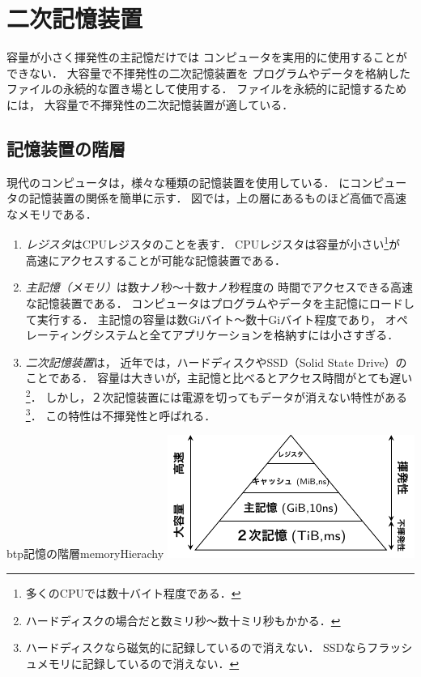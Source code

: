 \chapter{二次記憶装置}
容量が小さく揮発性の主記憶だけでは
コンピュータを実用的に使用することができない．
大容量で不揮発性の二次記憶装置を
プログラムやデータを格納したファイルの永続的な置き場として使用する．
ファイルを永続的に記憶するためには，
大容量で不揮発性の二次記憶装置が適している．

\section{記憶装置の階層}
現代のコンピュータは，様々な種類の記憶装置を使用している．
にコンピュータの記憶装置の関係を簡単に示す．
図では，上の層にあるものほど高価で高速なメモリである．

\begin{enumerate}
\item \emph{レジスタ}はCPUレジスタのことを表す．
  CPUレジスタは容量が小さい\footnote{多くのCPUでは数十バイト程度である．}が
  高速にアクセスすることが可能な記憶装置である．

\item \emph{主記憶（メモリ）}は数ナノ秒〜十数ナノ秒程度の
  時間でアクセスできる高速な記憶装置である．
  コンピュータはプログラムやデータを主記憶にロードして実行する．
  主記憶の容量は数Giバイト〜数十Giバイト程度であり，
  オペレーティングシステムと全てアプリケーションを格納すには小さすぎる．

\item \emph{二次記憶装置}は，
  近年では，ハードディスクやSSD（Solid State Drive）のことである．
  容量は大きいが，主記憶と比べるとアクセス時間がとても遅い\footnote{
    ハードディスクの場合だと数ミリ秒〜数十ミリ秒もかかる．}．
  しかし，２次記憶装置には電源を切ってもデータが消えない特性がある\footnote{
    ハードディスクなら磁気的に記録しているので消えない．
    SSDならフラッシュメモリに記録しているので消えない．}．
  この特性は不揮発性と呼ばれる．
\end{enumerate}

\begin{myfig}{btp}{記憶の階層}{memoryHierachy}
  \includegraphics[scale=1.6]{Fig/memoryHierarchy.pdf}
\end{myfig}

